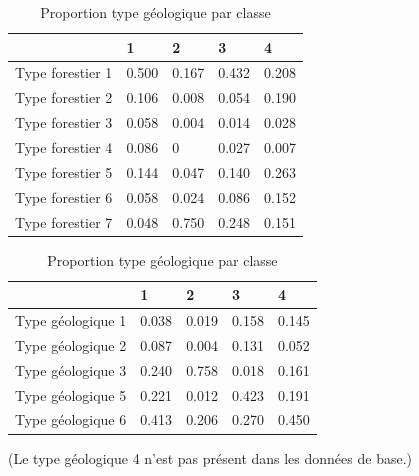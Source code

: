 \documentclass{article}
\begin{document}
\begin{table}[H]
    \centering
    \begin{minipage}{0.48\textwidth} %
        \centering
        \begin{tabular}{|l|l|l|l|l|}
        \hline
                            & 1     & 2     & 3     & 4     \\ \hline
        Type forestier 1                   & 0.500 & 0.167 & 0.432 & 0.208 \\ \hline
        Type forestier 2                   & 0.106 & 0.008 & 0.054 & 0.190 \\ \hline
        Type forestier 3                   & 0.058 & 0.004 & 0.014 & 0.028 \\ \hline
        Type forestier 4                   & 0.086 & 0     & 0.027 & 0.007 \\ \hline
        Type forestier 5                   & 0.144 & 0.047 & 0.140 & 0.263 \\ \hline
        Type forestier 6                   & 0.058 & 0.024 & 0.086 & 0.152 \\ \hline
        Type forestier 7                   & 0.048 & 0.750 & 0.248 & 0.151 \\ \hline
        \end{tabular}
        \caption{Proportion type forestier par classe}
    \end{minipage}\hfill %
    \begin{minipage}{0.48\textwidth} %
        \centering

        \begin{tabular}{|l|l|l|l|l|}
        \hline
                            & 1     & 2     & 3     & 4     \\ \hline
        Type géologique 1                   & 0.038 & 0.019 & 0.158 & 0.145 \\ \hline
        Type géologique 2                   & 0.087 & 0.004 & 0.131 & 0.052 \\ \hline
        Type géologique 3                   & 0.240 & 0.758 & 0.018 & 0.161 \\ \hline
        Type géologique 5                   & 0.221 & 0.012 & 0.423 & 0.191 \\ \hline
        Type géologique 6                   & 0.413 & 0.206 & 0.270 & 0.450 \\ \hline
        \end{tabular}
        \caption{Proportion type géologique par classe}
    \end{minipage}
\end{table}
(Le type géologique 4 n'est pas présent dans les données de base.)
\\
\end{document}
